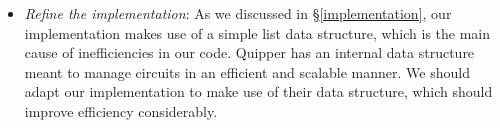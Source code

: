 \begin{itemize}
  \item \textit{Refine the implementation}: As we discussed in \S\ref{implementation}, our implementation makes use of a simple list data structure, which is the main cause of inefficiencies in our code. Quipper has an internal data structure meant to manage circuits in an efficient and scalable manner. We should adapt our implementation to make use of their data structure, which should improve efficiency considerably.

\end{itemize}
